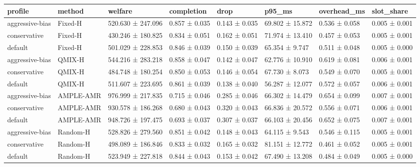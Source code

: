 \begin{tabular}{llllllll}
\toprule
profile & method & welfare & completion & drop & p95\_ms & overhead\_ms & slot\_share \\
\midrule
aggressive-bias & Fixed-H & 520.630 ± 247.096 & 0.857 ± 0.035 & 0.143 ± 0.035 & 69.802 ± 15.872 & 0.536 ± 0.058 & 0.005 ± 0.001 \\
conservative & Fixed-H & 430.246 ± 180.825 & 0.834 ± 0.051 & 0.162 ± 0.051 & 71.974 ± 13.410 & 0.457 ± 0.053 & 0.005 ± 0.001 \\
default & Fixed-H & 501.029 ± 228.853 & 0.846 ± 0.039 & 0.150 ± 0.039 & 65.354 ± 9.747 & 0.511 ± 0.048 & 0.005 ± 0.000 \\
aggressive-bias & QMIX-H & 544.216 ± 283.218 & 0.858 ± 0.047 & 0.142 ± 0.047 & 62.776 ± 10.910 & 0.619 ± 0.081 & 0.006 ± 0.001 \\
conservative & QMIX-H & 484.748 ± 180.254 & 0.850 ± 0.053 & 0.146 ± 0.054 & 67.730 ± 8.073 & 0.549 ± 0.070 & 0.005 ± 0.001 \\
default & QMIX-H & 511.607 ± 223.695 & 0.861 ± 0.039 & 0.138 ± 0.040 & 56.287 ± 12.077 & 0.572 ± 0.057 & 0.006 ± 0.001 \\
aggressive-bias & AMPLE-AMR & 976.999 ± 217.835 & 0.715 ± 0.046 & 0.285 ± 0.046 & 66.302 ± 14.479 & 0.654 ± 0.099 & 0.007 ± 0.001 \\
conservative & AMPLE-AMR & 930.578 ± 186.268 & 0.680 ± 0.043 & 0.320 ± 0.043 & 66.836 ± 20.572 & 0.556 ± 0.071 & 0.006 ± 0.001 \\
default & AMPLE-AMR & 948.726 ± 197.475 & 0.693 ± 0.037 & 0.307 ± 0.037 & 66.103 ± 20.456 & 0.652 ± 0.075 & 0.007 ± 0.001 \\
aggressive-bias & Random-H & 528.826 ± 279.560 & 0.851 ± 0.042 & 0.148 ± 0.043 & 64.115 ± 9.543 & 0.546 ± 0.115 & 0.005 ± 0.001 \\
conservative & Random-H & 498.089 ± 186.846 & 0.833 ± 0.032 & 0.165 ± 0.032 & 81.151 ± 12.772 & 0.461 ± 0.052 & 0.005 ± 0.001 \\
default & Random-H & 523.949 ± 227.818 & 0.844 ± 0.043 & 0.153 ± 0.042 & 67.490 ± 13.208 & 0.484 ± 0.049 & 0.005 ± 0.000 \\
\bottomrule
\end{tabular}
